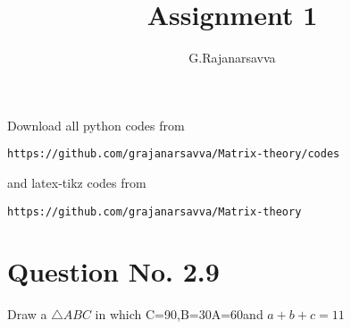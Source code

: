 \documentclass[journal,12pt,twocolumn]{IEEEtran}
\begin{document}
     \def\rightbox#1{\makebox[0in][r]{#1}}
     \def\centbox#1{\makebox[0in]{#1}}
     \def\topbox#1{\raisebox{-\baselineskip}[0in][0in]{#1}}
     \def\midbox#1{\raisebox{-0.5\baselineskip}[0in][0in]{#1}}
\vspace{3cm}
\title{Assignment 1}
\author{G.Rajanarsavva}
\maketitle
\newpage
\bigskip
\renewcommand{\thefigure}{\theenumi}
\renewcommand{\thetable}{\theenumi}
Download all python codes from 
\begin{lstlisting}
https://github.com/grajanarsavva/Matrix-theory/codes
\end{lstlisting}
%
and latex-tikz codes from 
%
\begin{lstlisting}
https://github.com/grajanarsavva/Matrix-theory
\end{lstlisting}
%
\section{Question No. 2.9}
Draw a $\triangle ABC$ in which \angle C=90\degree,\angle B=30\degree \angle A=60\degree and $a+b+c=11$
\end{document}

